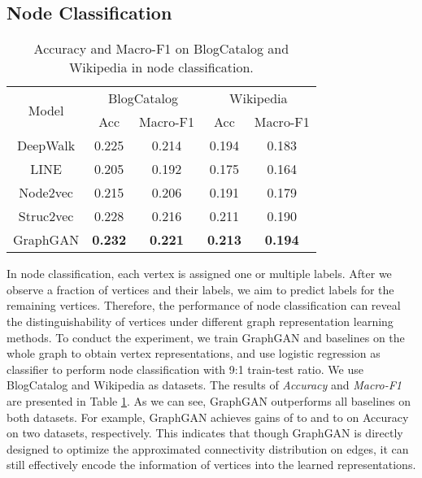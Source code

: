 \documentclass[letterpaper]{article}
\begin{document}
	
	\subsection{Node Classification}
		\begin{table}[t]
			\setlength{\abovecaptionskip}{3pt}
			\small
                	\centering
                	\caption{Accuracy and Macro-F1 on BlogCatalog and Wikipedia in node classification.}
                	\begin{tabular}{|c|c|c|c|c|}
                    	\hline
                    	\multirow{2}{*}{Model} & \multicolumn{2}{c|}{BlogCatalog} & \multicolumn{2}{c|}{Wikipedia} \\
                    	\cline{2-5}
                    	& Acc & Macro-F1 & Acc & Macro-F1 \\
                    	\hline
                    	DeepWalk & 0.225 & 0.214 & 0.194 & 0.183 \\
                    	\hline
                    	LINE & 0.205 & 0.192 & 0.175 & 0.164 \\
                    	\hline
                    	Node2vec & 0.215 & 0.206 & 0.191 & 0.179  \\
                    	\hline
                    	Struc2vec & 0.228 & 0.216 & 0.211 & 0.190 \\
                    	\hline
                    	GraphGAN & \textbf{0.232} & \textbf{0.221} & \textbf{0.213} & \textbf{0.194} \\
                    	\hline
			\end{tabular}
			\label{table:node_classification}
		\end{table}
		
		In node classification, each vertex is assigned one or multiple labels.
		After we observe a fraction of vertices and their labels, we aim to predict labels for the remaining vertices.
		Therefore, the performance of node classification can reveal the distinguishability of vertices under different graph representation learning methods.
		To conduct the experiment, we train GraphGAN and baselines on the whole graph to obtain vertex representations, and use logistic regression as classifier to perform node classification with 9:1 train-test ratio.
		We use BlogCatalog and Wikipedia as datasets.
		The results of \textit{Accuracy} and \textit{Macro-F1} are presented in Table \ref{table:node_classification}.
		As we can see, GraphGAN outperforms all baselines on both datasets.
		For example, GraphGAN achieves gains of  to  and  to  on Accuracy on two datasets, respectively.
		This indicates that though GraphGAN is directly designed to optimize the approximated connectivity distribution on edges, it can still effectively encode the information of vertices into the learned representations.
		 
\end{document}
